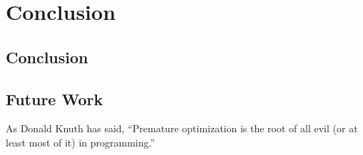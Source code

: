 \chapter{Conclusion}
\label{sec:conclusion}
\minitoc
\vspace*{1cm}

\section{Conclusion}

\section{Future Work}
As Donald Knuth has said, “Premature optimization is the root of all evil (or at least most of it) in programming.”